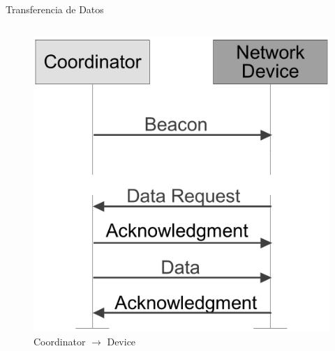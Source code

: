 \documentclass[aspectratio=169, handout]{beamer}
\begin{document}
\begin{frame}[t]{Transferencia de Datos}
\begin{columns}[t]
\begin{column}{.5\textwidth}
\begin{minipage}[t][0.7\textheight][s]{\columnwidth}
\begin{figure}[H]
				\includegraphics[height=.7\textheight]{./imagenes/coord-dev-beacon.jpg}
				\vfill
				\caption{Coordinator $\rightarrow$ Device}
			\end{figure}	 		
		\end{minipage}
	\end{column}
\end{columns}
\end{frame}
\end{document}
